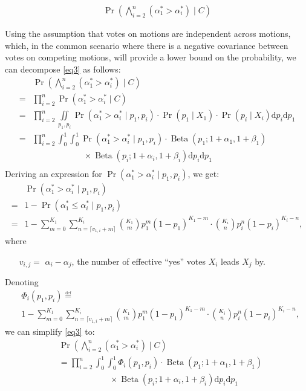 \documentclass[chi_draft]{sigchi}
\begin{document}
\begin{align}\label{eq3}
\Pr\left(\bigwedge_{i=2}^n (\alpha^*_1 > \alpha^*_i) \mid C\right)
\end{align}

Using the assumption
that votes on motions are independent across motions, which, in the common
scenario where there is a negative covariance between votes on competing
motions, will provide a lower bound on the probability, we can decompose \eqref{eq3} as follows:
\begin{align*}
& \Pr\left(\bigwedge_{i=2}^n (\alpha^*_1 > \alpha^*_i) \mid C\right)\\
=& \prod_{i=2}^n \Pr(\alpha^*_1 > \alpha^*_i \mid C)\\
=& \prod_{i=2}^n \iint\limits_{p_1, p_i} \Pr(\alpha^*_1 > \alpha^*_i \mid p_1, p_i) \cdot \Pr(p_1 \mid X_1) \cdot \Pr(p_i \mid X_i) \mathrm{d}p_i \mathrm{d}p_1\\
=& \prod_{i=2}^n \int_0^1 \int_0^1 \Pr(\alpha^*_1 > \alpha^*_i \mid p_1, p_i) \cdot \operatorname{Beta}(p_1; 1+\alpha_1,1+\beta_1) \\
& \qquad\qquad\qquad \times \operatorname{Beta}(p_i; 1+\alpha_i,1+\beta_i) \mathrm{d}p_i \mathrm{d}p_1\\
\end{align*}
Deriving an expression for $\Pr(\alpha^*_1 > \alpha^*_i \mid p_1, p_i)$, we get:
\begin{align*}
& \Pr(\alpha^*_1 > \alpha^*_i \mid p_1, p_i)\\
=& 1 - \Pr(\alpha^*_1 \leq \alpha^*_i \mid p_1, p_i)\\
=& 1 - \sum\limits_{m=0}^{K_1} \sum\limits_{n=\lceil{v_{1,i}+m}\rceil}^{K_i} {K_1 \choose m} p_1^{m} {(1-p_1)}^{K_1 - m} \cdot {K_i \choose n} p_i^{n} {(1-p_i)}^{K_i-n},
\end{align*}
where
\begin{description}
\begin{itemize}
\item[$v_{i,j} = $] $\alpha_i - \alpha_j$, the number of effective ``yes'' votes $X_i$ leads $X_j$ by.
\end{itemize}
\end{description}

Denoting
\begin{align}\label{eq4}
& \Phi_i(p_1,p_i) {\overset {\underset {\mathrm {def} }{}}{=}} \nonumber\\
& 1 - \sum\limits_{m=0}^{K_1} \sum\limits_{n=\lceil{v_{1,i}+m}\rceil}^{K_i} {K_1 \choose m} p_1^{m} {(1-p_1)}^{K_1 - m} \cdot {K_i \choose n} p_i^{n} {(1-p_i)}^{K_i-n},
\end{align}
we can simplify \eqref{eq3} to:
\begin{align}\label{eq5}
& \Pr\left(\bigwedge_{i=2}^n (\alpha^*_1 > \alpha^*_i) \mid C\right)\nonumber\\
&= \prod_{i=2}^n \int_0^1 \int_0^1 \Phi_i(p_1,p_i) \cdot \operatorname{Beta}(p_1; 1+\alpha_1,1+\beta_1) \nonumber\\
& \qquad\qquad\qquad \times \operatorname{Beta}(p_i; 1+\alpha_i,1+\beta_i) \mathrm{d}p_i \mathrm{d}p_1
\end{align}
\end{document}
